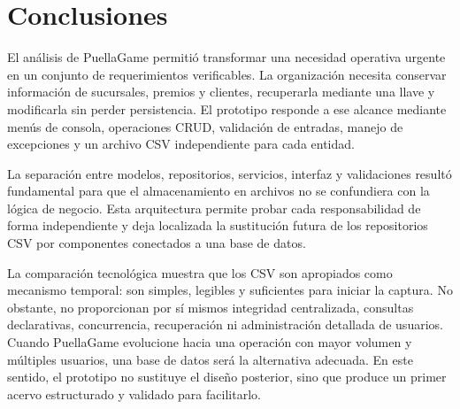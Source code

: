 \section{Conclusiones}

El análisis de PuellaGame permitió transformar una necesidad operativa urgente
en un conjunto de requerimientos verificables. La organización necesita
conservar información de sucursales, premios y clientes, recuperarla mediante
una llave y modificarla sin perder persistencia. El prototipo responde a ese
alcance mediante menús de consola, operaciones CRUD, validación de entradas,
manejo de excepciones y un archivo CSV independiente para cada entidad.

La separación entre modelos, repositorios, servicios, interfaz y validaciones
resultó fundamental para que el almacenamiento en archivos no se confundiera
con la lógica de negocio. Esta arquitectura permite probar cada responsabilidad
de forma independiente y deja localizada la sustitución futura de los
repositorios CSV por componentes conectados a una base de datos.

La comparación tecnológica muestra que los CSV son apropiados como mecanismo
temporal: son simples, legibles y suficientes para iniciar la captura. No
obstante, no proporcionan por sí mismos integridad centralizada, consultas
declarativas, concurrencia, recuperación ni administración detallada de
usuarios. Cuando PuellaGame evolucione hacia una operación con mayor volumen y
múltiples usuarios, una base de datos será la alternativa adecuada. En este
sentido, el prototipo no sustituye el diseño posterior, sino que produce un
primer acervo estructurado y validado para facilitarlo.
